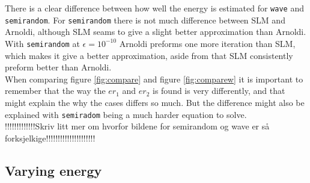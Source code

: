 There is a clear difference between how well the energy is estimated for \texttt{wave} and \texttt{semirandom}. For \texttt{semirandom} there is not much difference between SLM and Arnoldi, although SLM seams to give a slight better approximation than Arnoldi. With \texttt{semirandom} at $\epsilon = 10^{-10}$ Arnoldi preforms one more iteration than SLM, which makes it give a better approximation, aside from that SLM consistently preform better than Arnoldi.\\
When comparing figure \ref{fig:compare} and figure \ref{fig:comparew} it is important to remember that the way the $er_1$ and $er_2$ is found is very differently, and that might explain the why the cases differs so much. But the difference might also be explained with \texttt{semiradom} being a much harder equation to solve.\\
!!!!!!!!!!!!!Skriv litt mer om hvorfor bildene for semirandom og wave er så forksjelkige!!!!!!!!!!!!!!!!!!!!!\\

\subsection{Varying energy}%


